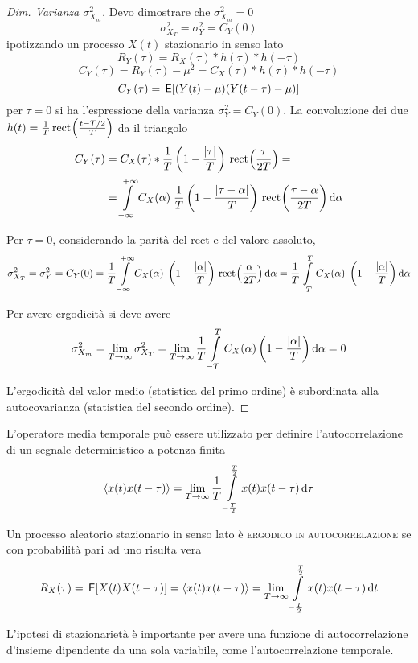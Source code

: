 \begin{proof}[Dim. Varianza $\sigma^2_{X_m}$]
Devo dimostrare che $\sigma^2_{X_m}=0$
\[
	\sigma^2_{X_T}=\sigma^2_{Y}=C_Y(0)
\]
ipotizzando un processo $X(t)$ stazionario in senso lato
\[
	R_Y(\tau)=R_X(\tau)\ast h(\tau)\ast h(-\tau)
\]
\[
	C_Y(\tau)=R_Y(\tau)-\mu^2=C_X(\tau)\ast h(\tau)\ast h(-\tau) 
\]
\[
	C_Y(\tau)=\,{\operatorname{\mathsf{E}}}\!\left[{(Y(t)-\mu)(Y(t-\tau)-\mu)}\right]
\]
per $\tau=0$ si ha l'espressione della varianza $\sigma^2_Y=C_Y(0)$.
La convoluzione dei due $h(t)=\frac{1}{T}\,{\operatorname{rect}}^{}\!\left({\frac{t-T/2}{T}}\right)$ da il triangolo
\[
	\begin{split}
		C_Y(\tau)&=C_X(\tau)\ast \frac{1}{T}\left(1-\frac{\left|{\tau}\right|}{T}\right)\,{\operatorname{rect}}^{}\!\left({\frac{\tau}{2 T}}\right)=\\
		&=\int\limits_{-\infty}^{+\infty}{C_X(\alpha)\;\frac{1}{T}\left(1-\frac{\left|{\tau-\alpha}\right|}{T}\right)\,{\operatorname{rect}}^{}\!\left({\frac{\tau-\alpha}{2 T}}\right)}{\,\mathop{}\!\mathrm{d}{\alpha}}
	\end{split}
\]

Per $\tau=0$, considerando la parità del rect e del valore assoluto,
\[
	\sigma^2_{X_T}=\sigma^2_{Y}=C_Y(0)=\frac{1}{T}\int\limits_{-\infty}^{+\infty}{C_X(\alpha)\;\left(1-\frac{\left|{\alpha}\right|}{T}\right)\,{\operatorname{rect}}^{}\!\left({\frac{\alpha}{2 T}}\right)}{\,\mathop{}\!\mathrm{d}{\alpha}}=\frac{1}{T}\int\limits_{-T}^{T}{C_X(\alpha)\; \left(1-\frac{\left|{\alpha}\right|}{T}\right)}{\,\mathop{}\!\mathrm{d}{\alpha}}
\]

Per avere ergodicità si deve avere
\[
	\sigma^2_{X_m}=\lim\limits_{T\to\infty}\sigma^2_{X_T}=\lim\limits_{T\to\infty}\frac{1}{T}\int\limits_{-T}^{T}{C_X(\alpha)\left(1-\frac{\left|{\alpha}\right|}{T}\right)}{\,\mathop{}\!\mathrm{d}{\alpha}}=0
\]

L'ergodicità del valor medio (statistica del primo ordine) è subordinata alla autocovarianza (statistica del secondo ordine).
\end{proof}

L'operatore media temporale può essere utilizzato per definire l'autocorrelazione di un segnale deterministico a potenza finita
\begin{equation}
	\langle x(t)x(t-\tau)\rangle=\lim\limits_{T\to\infty}\frac{1}{T}\int\limits_{-\frac{T}{2}}^{\frac{T}{2}}{x(t) x(t-\tau)}{\,\mathop{}\!\mathrm{d}{\tau}}
\end{equation}

\begin{definizione}
Un processo aleatorio stazionario in senso lato è \textsc{ergodico in autocorrelazione} se con probabilità pari ad uno risulta vera
\begin{equation}
	R_X(\tau)=\,{\operatorname{\mathsf{E}}}\!\left[{X(t)X(t-\tau)}\right]=\langle x(t)x(t-\tau)\rangle=\lim\limits_{T\to\infty}\int\limits_{-\frac{T}{2}}^{\frac{T}{2}}{x(t)x(t-\tau)}{\,\mathop{}\!\mathrm{d}{t}}
\end{equation}
\end{definizione}
L'ipotesi di stazionarietà è importante per avere una funzione di autocorrelazione d'insieme dipendente da una sola variabile, come l'autocorrelazione temporale.

